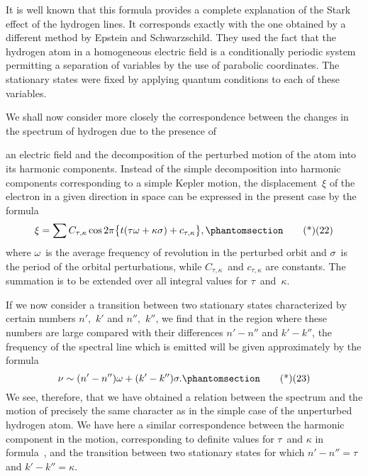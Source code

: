 It is well known that this formula provides a complete explanation
of the Stark effect of the hydrogen lines. It corresponds
exactly with the one obtained by a different method by Epstein
and Schwarzschild. They used the fact that the hydrogen atom in
a homogeneous electric field is a conditionally periodic system
permitting a separation of variables by the use of parabolic coordinates.
The stationary states were fixed by applying quantum
conditions to each of these variables.

We shall now consider more closely the correspondence between
the changes in the spectrum of hydrogen due to the presence of

an electric field and the decomposition of the perturbed motion
of the atom into its harmonic components. Instead of the simple
decomposition into harmonic components corresponding to a simple
Kepler motion, the displacement~$\xi$ of the electron in a given
direction in space can be expressed in the present case by the
formula
\[
\xi = \sum C_{\tau,\kappa} \cos 2\pi \bigl\{t(\tau\omega + \kappa\sigma) + c_{\tau,\kappa}\bigr\},
\Tag{(22)}
\]
where $\omega$~is the average frequency of revolution in the perturbed
orbit and $\sigma$~is the period of the orbital perturbations, while $C_{\tau,\kappa}$~and
$c_{\tau,\kappa}$ are constants. The summation is to be extended over all integral
values for $\tau$~and~$\kappa$.

If we now consider a transition between two stationary states
characterized by certain numbers $n'$,~$k'$ and $n''$,~$k''$, we find that in
the region where these numbers are large compared with their
differences $n' - n''$ and $k' - k''$, the frequency of the spectral line
which is emitted will be given approximately by the formula
\[
\nu \sim (n' - n'')\omega + (k' - k'')\sigma.
\Tag{(23)}
\]
We see, therefore, that we have obtained a relation between the
spectrum and the motion of precisely the same character as in the
simple case of the unperturbed hydrogen atom. We have here a
similar correspondence between the harmonic component in the
motion, corresponding to definite values for $\tau$~and $\kappa$ in formula~,
and the transition between two stationary states for which $n' - n'' = \tau$
and $k' - k'' = \kappa$.

